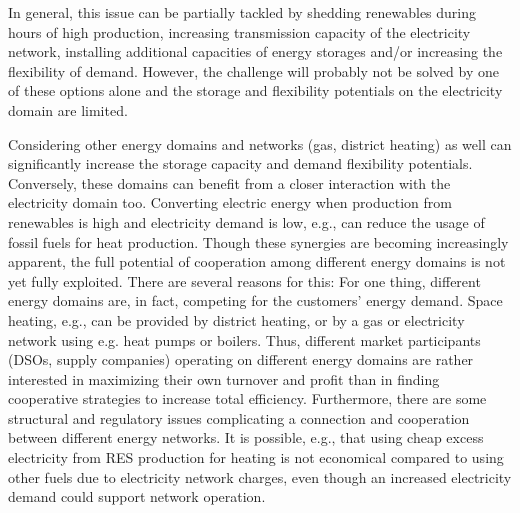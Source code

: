 \documentclass[a4paper,twoside]{article}
\begin{document}
In general, this issue can be partially tackled by shedding
renewables during hours of high production, increasing
transmission capacity of the electricity network, installing
additional capacities of energy storages and/or increasing the
flexibility of demand.
However, the challenge will probably not be solved by one of these
options alone and the storage and flexibility potentials on the
electricity domain are limited. 

Considering other energy domains and networks (gas, district
heating) as well can significantly increase the storage capacity and
demand flexibility potentials. Conversely, these domains can benefit
from a closer interaction with the electricity domain too. Converting
electric energy when production from renewables is high and
electricity demand is low, e.g., can reduce the usage of
fossil fuels for heat production. Though these synergies are becoming
increasingly apparent, the full potential of cooperation among
different energy domains is not yet fully exploited. There are
several reasons for this: For one thing, different energy domains are,
in fact, competing for the customers’ energy demand. Space heating, e.g.,
can be provided by district heating,  or by a gas or electricity network
using e.g. heat pumps or boilers. Thus, different market
participants (DSOs, supply companies) operating on different energy
domains are rather interested in maximizing their own turnover and
profit than in finding cooperative strategies to increase total
efficiency. Furthermore, there are some structural and regulatory
issues complicating a connection and cooperation between different
energy networks. It is possible, e.g., that using cheap excess
electricity from RES production for heating is not economical compared
to using other fuels due to electricity network charges, even though
an increased electricity demand could support network operation.
\end{document}
